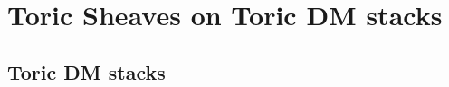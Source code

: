 \documentclass[10pt]{amsart}
\newtheorem{prop}{Proposition}[section]
\newcommand{\sX}{{\mathcal X}}
\numberwithin{equation}{subsection}
\begin{document}

\section{Toric Sheaves on Toric DM stacks}
\subsection{Toric DM stacks}
\end{document}
